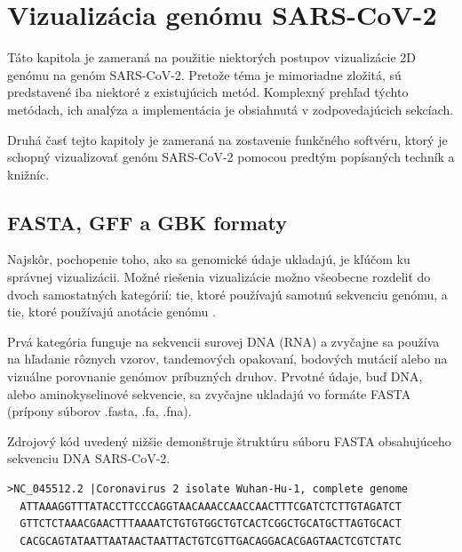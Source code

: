 
\chapter{Vizualizácia genómu SARS-CoV-2}

Táto kapitola je zameraná na použitie niektorých postupov vizualizácie 2D genómu na genóm SARS-CoV-2.
Pretože téma je mimoriadne zložitá, sú predstavené iba niektoré z existujúcich metód.
Komplexný prehľad týchto metódach, ich analýza a implementácia je obsiahnutá v zodpovedajúcich sekcíach.

Druhá časť tejto kapitoly je zameraná na zostavenie funkčného softvéru, ktorý je schopný vizualizovať genóm SARS-CoV-2 pomocou predtým popísaných techník a knižníc.

\section{FASTA, GFF a GBK formaty}

Najskôr, pochopenie toho, ako sa genomické údaje ukladajú, je kľúčom ku správnej vizualizácii.
Možné riešenia vizualizácie možno všeobecne rozdeliť do dvoch samostatných kategórií: tie, ktoré používajú samotnú sekvenciu genómu, a tie, ktoré používajú anotácie genómu \cite{covvisual}.

Prvá kategória funguje na sekvencii surovej DNA (RNA) a zvyčajne sa používa na hľadanie rôznych vzorov, tandemových opakovaní, bodových mutácií alebo na vizuálne porovnanie genómov príbuzných druhov.
Prvotné údaje, buď DNA, alebo aminokyselinové sekvencie, sa zvyčajne ukladajú vo formáte FASTA (prípony súborov .fasta, .fa, .fna)\cite{fasta}.

Zdrojový kód uvedený nižšie demonštruje štruktúru súboru FASTA obsahujúceho sekvenciu DNA SARS-CoV-2.

\begin{lstlisting}[caption={Prvých 180 nukleotidov z genómovej sekvencie SARS-CoV-2 vo formáte FASTA. Riadok popisu, ktorý sa začína znakom „>“, obsahuje informácie o postupnosti. Za začiatočným riadkom je samotná aktuálna sekvencia v štandardnom jednopísmenovom reťazci znakov.},captionpos=b]
  >NC_045512.2 |Coronavirus 2 isolate Wuhan-Hu-1, complete genome
  ATTAAAGGTTTATACCTTCCCAGGTAACAAACCAACCAACTTTCGATCTCTTGTAGATCT
  GTTCTCTAAACGAACTTTAAAATCTGTGTGGCTGTCACTCGGCTGCATGCTTAGTGCACT
  CACGCAGTATAATTAATAACTAATTACTGTCGTTGACAGGACACGAGTAACTCGTCTATC
\end{lstlisting}


